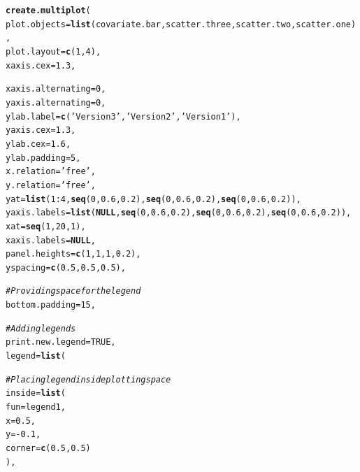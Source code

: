 \documentclass[letterpaper]{article}\usepackage[]{graphicx}\usepackage[]{color}
\makeatletter
\newcommand{\hlnum}[1]{\textcolor[rgb]{0.686,0.059,0.569}{#1}}%
\newcommand{\hlstr}[1]{\textcolor[rgb]{0.192,0.494,0.8}{#1}}%
\newcommand{\hlcom}[1]{\textcolor[rgb]{0.678,0.584,0.686}{\textit{#1}}}%
\newcommand{\hlopt}[1]{\textcolor[rgb]{0,0,0}{#1}}%
\newcommand{\hlstd}[1]{\textcolor[rgb]{0.345,0.345,0.345}{#1}}%
\newcommand{\hlkwa}[1]{\textcolor[rgb]{0.161,0.373,0.58}{\textbf{#1}}}%
\newcommand{\hlkwc}[1]{\textcolor[rgb]{0.333,0.667,0.333}{#1}}%
\newcommand{\hlkwd}[1]{\textcolor[rgb]{0.737,0.353,0.396}{\textbf{#1}}}%
\newenvironment{kframe}{%
 \def\at@end@of@kframe{}%
 \ifinner\ifhmode%
  \def\at@end@of@kframe{\end{minipage}}%
  \begin{minipage}{\columnwidth}%
 \fi\fi%
 \def\FrameCommand##1{\hskip\@totalleftmargin \hskip-\fboxsep
 \colorbox{shadecolor}{##1}\hskip-\fboxsep
     \hskip-\linewidth \hskip-\@totalleftmargin \hskip\columnwidth}%
 \MakeFramed {\advance\hsize-\width
   \@totalleftmargin\z@ \linewidth\hsize
   \@setminipage}}%
 {\par\unskip\endMakeFramed%
 \at@end@of@kframe}
\newenvironment{knitrout}{}{} %
\makeatother
\begin{document}
\begin{knitrout}
\color{fgcolor}\begin{kframe}
\begin{alltt}
\hlkwd{create.multiplot}\hlstd{(}
    \hlkwc{plot.objects} \hlstd{=} \hlkwd{list}\hlstd{(covariate.bar, scatter.three, scatter.two, scatter.one),}
    \hlkwc{plot.layout} \hlstd{=} \hlkwd{c}\hlstd{(}\hlnum{1}\hlstd{,}\hlnum{4}\hlstd{),}
    \hlkwc{xaxis.cex} \hlstd{=} \hlnum{1.3}\hlstd{,}

    \hlkwc{xaxis.alternating} \hlstd{=} \hlnum{0}\hlstd{,}
    \hlkwc{yaxis.alternating} \hlstd{=} \hlnum{0}\hlstd{,}
    \hlkwc{ylab.label} \hlstd{=} \hlkwd{c}\hlstd{(}\hlstr{'Version 3'}\hlstd{,} \hlstr{'Version 2'}\hlstd{,} \hlstr{'Version 1'}\hlstd{),}
    \hlkwc{yaxis.cex} \hlstd{=} \hlnum{1.3}\hlstd{,}
    \hlkwc{ylab.cex} \hlstd{=} \hlnum{1.6}\hlstd{,}
    \hlkwc{ylab.padding} \hlstd{=} \hlnum{5}\hlstd{,}
    \hlkwc{x.relation} \hlstd{=} \hlstr{'free'}\hlstd{,}
    \hlkwc{y.relation} \hlstd{=} \hlstr{'free'}\hlstd{,}
    \hlkwc{yat} \hlstd{=} \hlkwd{list}\hlstd{(}\hlnum{1}\hlopt{:}\hlnum{4}\hlstd{,} \hlkwd{seq}\hlstd{(}\hlnum{0}\hlstd{,} \hlnum{0.6}\hlstd{,} \hlnum{0.2}\hlstd{),} \hlkwd{seq}\hlstd{(}\hlnum{0}\hlstd{,} \hlnum{0.6}\hlstd{,} \hlnum{0.2}\hlstd{),} \hlkwd{seq}\hlstd{(}\hlnum{0}\hlstd{,} \hlnum{0.6}\hlstd{,} \hlnum{0.2}\hlstd{)),}
    \hlkwc{yaxis.labels} \hlstd{=} \hlkwd{list}\hlstd{(}\hlkwa{NULL}\hlstd{,} \hlkwd{seq}\hlstd{(}\hlnum{0}\hlstd{,} \hlnum{0.6}\hlstd{,} \hlnum{0.2}\hlstd{),} \hlkwd{seq}\hlstd{(}\hlnum{0}\hlstd{,} \hlnum{0.6}\hlstd{,} \hlnum{0.2}\hlstd{),} \hlkwd{seq}\hlstd{(}\hlnum{0}\hlstd{,} \hlnum{0.6}\hlstd{,} \hlnum{0.2}\hlstd{)),}
    \hlkwc{xat} \hlstd{=} \hlkwd{seq}\hlstd{(}\hlnum{1}\hlstd{,} \hlnum{20}\hlstd{,} \hlnum{1}\hlstd{),}
    \hlkwc{xaxis.labels} \hlstd{=} \hlkwa{NULL}\hlstd{,}
    \hlkwc{panel.heights} \hlstd{=} \hlkwd{c}\hlstd{(}\hlnum{1}\hlstd{,} \hlnum{1}\hlstd{,} \hlnum{1}\hlstd{,} \hlnum{0.2}\hlstd{),}
    \hlkwc{yspacing} \hlstd{=} \hlkwd{c}\hlstd{(}\hlnum{0.5}\hlstd{,} \hlnum{0.5}\hlstd{,} \hlnum{0.5}\hlstd{),}

    \hlcom{# Providing space for the legend}
    \hlkwc{bottom.padding} \hlstd{=} \hlnum{15}\hlstd{,}

    \hlcom{# Adding legends}
    \hlkwc{print.new.legend} \hlstd{=} \hlnum{TRUE}\hlstd{,}
    \hlkwc{legend} \hlstd{=} \hlkwd{list}\hlstd{(}

        \hlcom{# Placing legend inside plotting space}
        \hlkwc{inside} \hlstd{=} \hlkwd{list}\hlstd{(}
            \hlkwc{fun} \hlstd{= legend1,}
            \hlkwc{x} \hlstd{=} \hlnum{0.5}\hlstd{,}
            \hlkwc{y} \hlstd{=} \hlopt{-}\hlnum{0.1}\hlstd{,}
            \hlkwc{corner} \hlstd{=} \hlkwd{c}\hlstd{(}\hlnum{0.5}\hlstd{,} \hlnum{0.5}\hlstd{)}
            \hlstd{),}


\end{alltt}
\end{kframe}
\end{knitrout}
\end{document}
